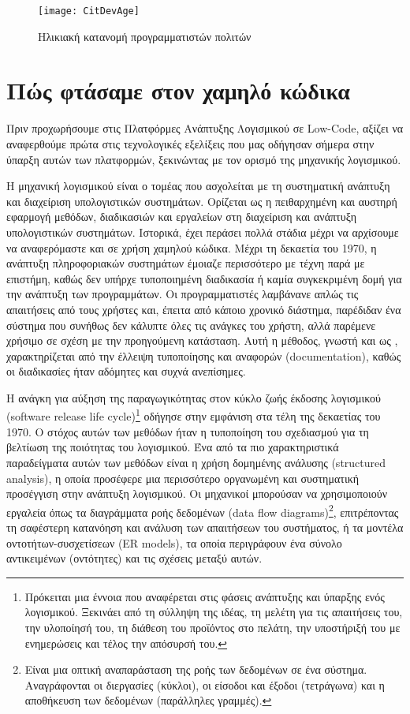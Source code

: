                     \begin{figure}[h!] \noindent \centering
                        \texttt{[image: CitDevAge]}
                        \caption{Ηλικιακή κατανομή προγραμματιστών πολιτών \cite{CitDevTrackVia}}
                        \label{fig:CitDevAge}
                    \end{figure}


    \section{Πώς φτάσαμε στον χαμηλό κώδικα}
        Πριν προχωρήσουμε στις Πλατφόρμες Ανάπτυξης Λογισμικού σε Low-Code, αξίζει να αναφερθούμε πρώτα στις τεχνολογικές εξελίξεις που μας οδήγησαν σήμερα στην ύπαρξη αυτών των πλατφορμών, ξεκινώντας με τον ορισμό της μηχανικής λογισμικού.

        Η μηχανική λογισμικού είναι ο τομέας που ασχολείται με τη συστηματική ανάπτυξη και διαχείριση υπολογιστικών συστημάτων. Ορίζεται ως η πειθαρχημένη και αυστηρή εφαρμογή μεθόδων, διαδικασιών και εργαλείων στη διαχείριση και ανάπτυξη υπολογιστικών συστημάτων. Ιστορικά, έχει περάσει πολλά στάδια μέχρι να αρχίσουμε να αναφερόμαστε και σε χρήση χαμηλού κώδικα. Μέχρι τη δεκαετία του 1970, η ανάπτυξη πληροφοριακών συστημάτων έμοιαζε περισσότερο με τέχνη παρά με επιστήμη, καθώς δεν υπήρχε τυποποιημένη διαδικασία ή καμία συγκεκριμένη δομή για την ανάπτυξη των προγραμμάτων. Οι προγραμματιστές λαμβάνανε απλώς τις απαιτήσεις από τους χρήστες και, έπειτα από κάποιο χρονικό διάστημα, παρέδιδαν ένα σύστημα που συνήθως δεν κάλυπτε όλες τις ανάγκες του χρήστη, αλλά παρέμενε χρήσιμο σε σχέση με την προηγούμενη κατάσταση. Αυτή η μέθοδος, γνωστή και ως , χαρακτηρίζεται από την έλλειψη τυποποίησης και αναφορών (documentation), καθώς οι διαδικασίες ήταν αδόμητες και συχνά ανεπίσημες.

        Η ανάγκη για αύξηση της παραγωγικότητας στον κύκλο ζωής έκδοσης λογισμικού (software release life cycle)\footnote{Πρόκειται μια έννοια που αναφέρεται στις φάσεις ανάπτυξης και ύπαρξης ενός λογισμικού. Ξεκινάει από τη σύλληψη της ιδέας, τη μελέτη για τις απαιτήσεις του, την υλοποίησή του, τη διάθεση του προϊόντος στο πελάτη, την υποστήριξή του με ενημερώσεις και τέλος την απόσυρσή του.} οδήγησε στην εμφάνιση  στα τέλη της δεκαετίας του 1970. Ο στόχος αυτών των μεθόδων ήταν η τυποποίηση του σχεδιασμού για τη βελτίωση της ποιότητας του λογισμικού. Ένα από τα πιο χαρακτηριστικά παραδείγματα αυτών των μεθόδων είναι η χρήση δομημένης ανάλυσης (structured analysis), η οποία προσέφερε μια περισσότερο οργανωμένη και συστηματική προσέγγιση στην ανάπτυξη λογισμικού. Οι μηχανικοί μπορούσαν να χρησιμοποιούν εργαλεία όπως τα διαγράμματα ροής δεδομένων (data flow diagrams)\footnote{Είναι μια οπτική αναπαράσταση της ροής των δεδομένων σε ένα σύστημα. Αναγράφονται οι διεργασίες (κύκλοι), οι είσοδοι και έξοδοι (τετράγωνα) και η αποθήκευση των δεδομένων (παράλληλες γραμμές).}, επιτρέποντας τη σαφέστερη κατανόηση και ανάλυση των απαιτήσεων του συστήματος, ή τα μοντέλα οντοτήτων-συσχετίσεων (ER models), τα οποία περιγράφουν ένα σύνολο αντικειμένων (οντότητες) και τις σχέσεις μεταξύ αυτών.


